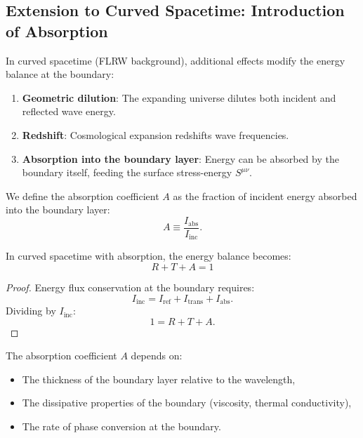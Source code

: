 \subsection{Extension to Curved Spacetime: Introduction of Absorption}
\label{app:curved_spacetime}

In curved spacetime (FLRW background), additional effects modify the energy balance at the boundary:

\begin{enumerate}
    \item \textbf{Geometric dilution}: The expanding universe dilutes both incident and reflected wave energy.
    \item \textbf{Redshift}: Cosmological expansion redshifts wave frequencies.
    \item \textbf{Absorption into the boundary layer}: Energy can be absorbed by the boundary itself, feeding the surface stress-energy $S^{\mu\nu}$.
\end{enumerate}

\begin{definition}
We define the absorption coefficient $A$ as the fraction of incident energy absorbed into the boundary layer:
\begin{equation}
\label{eq:absorption_def}
A \equiv \frac{I_{\text{abs}}}{I_{\text{inc}}}.
\end{equation}
\end{definition}

\begin{proposition}
\label{prop:R_T_A}
In curved spacetime with absorption, the energy balance becomes:
\begin{equation}
\label{eq:R_T_A}
\boxed{R + T + A = 1}
\end{equation}
\end{proposition}

\begin{proof}
Energy flux conservation at the boundary requires:
\begin{equation}
I_{\text{inc}} = I_{\text{ref}} + I_{\text{trans}} + I_{\text{abs}}.
\end{equation}
Dividing by $I_{\text{inc}}$:
\begin{equation}
1 = R + T + A.
\end{equation}
\end{proof}

The absorption coefficient $A$ depends on:
\begin{itemize}
    \item The thickness of the boundary layer relative to the wavelength,
    \item The dissipative properties of the boundary (viscosity, thermal conductivity),
    \item The rate of phase conversion at the boundary.
\end{itemize}

